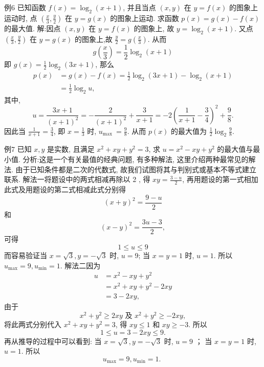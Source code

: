 例6 已知函数 $f(x)=\log _2(x+1)$, 并且当点 $(x, y)$ 在 $y=f(x)$ 的图象上运动时, 点 $\left(\frac{x}{3}, \frac{y}{2}\right)$ 在 $y=g(x)$ 的图象上运动.
求函数 $p(x)=g(x)-f(x)$ 的最大值.
解:因点 $(x, y)$ 在 $y=f(x)$ 的图象上, 故 $y=\log _2(x+1)$. 又点 $\left(\frac{x}{3}, \frac{y}{2}\right)$ 在 $y=g(x)$ 的图象上,故 $\frac{y}{2}=g\left(\frac{x}{3}\right)$. 从而
$$
g\left(\frac{x}{3}\right)=\frac{1}{2} \log _2(x+1)
$$
即 $g(x)=\frac{1}{2} \log _2(3 x+1)$, 那么
$$
\begin{aligned}
p(x) & =g(x)-f(x)=\frac{1}{2} \log _2(3 x+1)-\log _2(x+1) \\
& =\frac{1}{2} \log _2 u,
\end{aligned}
$$
其中,
$$
u=\frac{3 x+1}{(x+1)^2}=-\frac{2}{(x+1)^2}+\frac{3}{x+1}=-2\left(\frac{1}{x+1}-\frac{3}{4}\right)^2+\frac{9}{8} .
$$
因此当 $\frac{1}{x+1}=\frac{3}{4}$, 即 $x=\frac{1}{3}$ 时, $u_{\text {max }}=\frac{9}{8}$. 从而 $p(x)$ 的最大值为 $\frac{1}{2} \log _2 \frac{9}{8}$.



例7 已知 $x, y$ 是实数, 且满足 $x^2+x y+y^2=3$, 求 $u=x^2-x y+y^2$ 的最大值与最小值.
分析:这是一个有关最值的经典问题, 有多种解法, 这里介绍两种最常见的解法.
由于已知条件都是二次的代数式, 故我们试图将其与判别式或基本不等式建立联系.
解法一将题设中的两式相减再除以 2 , 得 $x y=\frac{3-u}{2}$, 再用题设的第一式相加此式及用题设的第二式相减此式分别得
$$
(x+y)^2=\frac{9-u}{2}
$$
和
$$
(x-y)^2=\frac{3 u-3}{2},
$$
可得
$$
1 \leqslant u \leqslant 9
$$
而容易验证当 $x=\sqrt{3}, y=-\sqrt{3}$ 时, $u=9$;
当 $x=y=1$ 时, $u=1$.
所以 $u_{\max }=9, u_{\min }=1$.
解法二因为
$$
\begin{aligned}
u & =x^2-x y+y^2 \\
& =x^2+x y+y^2-2 x y \\
& =3-2 x y,
\end{aligned}
$$
由于
$$
x^2+y^2 \geqslant 2 x y \text { 及 } x^2+y^2 \geqslant-2 x y,
$$
将此两式分别代入 $x^2+x y+y^2=3$, 得 $x y \leqslant 1$ 和 $x y \geqslant-3$.
所以
$$
1 \leqslant u=3-2 x y \leqslant 9 .
$$
再从推导的过程中可以看到:
当 $x=\sqrt{3}, y=-\sqrt{3}$ 时, $u=9$ ；
当 $x=y=1$ 时, $u=1$.
所以
$$
u_{\max }=9, u_{\min }=1 \text {. }
$$



